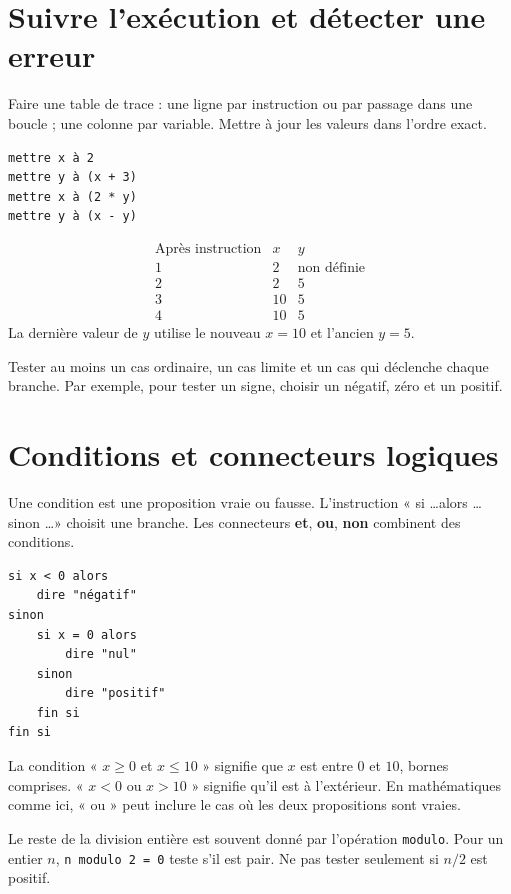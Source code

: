 \documentclass[../cours_3e.tex]{subfiles}
\begin{document}
\section{Suivre l'exécution et détecter une erreur}
\begin{methode}
Faire une table de trace : une ligne par instruction ou par passage dans une boucle ; une colonne par variable. Mettre à jour les valeurs dans l'ordre exact.
\end{methode}
\begin{exemple}
\begin{lstlisting}
mettre x à 2
mettre y à (x + 3)
mettre x à (2 * y)
mettre y à (x - y)
\end{lstlisting}
\[
\begin{array}{c|rr}
\text{Après instruction}&x&y\\\hline
1&2&\text{non définie}\\
2&2&5\\
3&10&5\\
4&10&5
\end{array}
\]
La dernière valeur de $y$ utilise le nouveau $x=10$ et l'ancien $y=5$.
\end{exemple}
Tester au moins un cas ordinaire, un cas limite et un cas qui déclenche chaque branche. Par exemple, pour tester un signe, choisir un négatif, zéro et un positif.
\section{Conditions et connecteurs logiques}
\begin{definition}
Une condition est une proposition vraie ou fausse. L'instruction « si \ldots alors \ldots sinon \ldots » choisit une branche. Les connecteurs \textbf{et}, \textbf{ou}, \textbf{non} combinent des conditions.
\end{definition}
\begin{lstlisting}
si x < 0 alors
    dire "négatif"
sinon
    si x = 0 alors
        dire "nul"
    sinon
        dire "positif"
    fin si
fin si
\end{lstlisting}
La condition « $x\geq0$ et $x\leq10$ » signifie que $x$ est entre $0$ et $10$, bornes comprises. « $x<0$ ou $x>10$ » signifie qu'il est à l'extérieur. En mathématiques comme ici, « ou » peut inclure le cas où les deux propositions sont vraies.

Le reste de la division entière est souvent donné par l'opération \texttt{modulo}. Pour un entier $n$, \texttt{n modulo 2 = 0} teste s'il est pair. Ne pas tester seulement si $n/2$ est positif.
\end{document}
